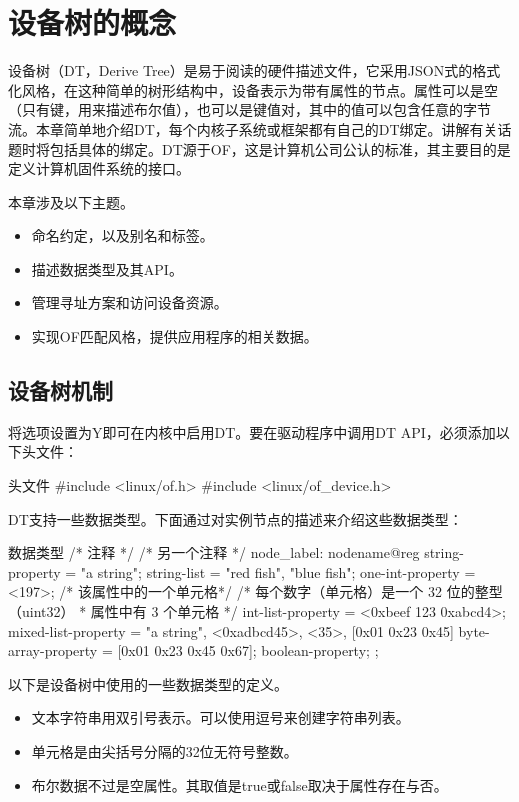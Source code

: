 \documentclass[lang=cn,newtx,10pt,scheme=chinese]{elegantbook}
\begin{document}
\chapter{设备树的概念}

设备树（DT，Derive Tree）是易于阅读的硬件描述文件，它采用JSON式的格式化风格，在这种简单的树形结构中，设备表示为带有属性的节点。属性可以是空（只有键，用来描述布尔值），也可以是键值对，其中的值可以包含任意的字节流。本章简单地介绍DT，每个内核子系统或框架都有自己的DT绑定。讲解有关话题时将包括具体的绑定。DT源于OF，这是计算机公司公认的标准，其主要目的是定义计算机固件系统的接口。

本章涉及以下主题。

\begin{itemize}
\item 命名约定，以及别名和标签。
\item 描述数据类型及其API。
\item 管理寻址方案和访问设备资源。
\item 实现OF匹配风格，提供应用程序的相关数据。
\end{itemize}

\section{设备树机制}

将选项设置为Y即可在内核中启用DT。要在驱动程序中调用DT API，必须添加以下头文件：

\begin{mycode}{头文件}
#include <linux/of.h>
#include <linux/of_device.h>
\end{mycode}

DT支持一些数据类型。下面通过对实例节点的描述来介绍这些数据类型：

\begin{mycode}{数据类型}
/* 注释 */
/* 另一个注释 */
node_label: nodename@reg{
    string-property = "a string";
    string-list = "red fish", "blue fish";
    one-int-property = <197>; /* 该属性中的一个单元格*/
    /* 每个数字（单元格）是一个 32 位的整型（uint32）
     * 属性中有 3 个单元格
     */
    int-list-property = <0xbeef 123 0xabcd4>;
    mixed-list-property = "a string", <0xadbcd45>, <35>, [0x01 0x23 0x45]
    byte-array-property = [0x01 0x23 0x45 0x67];
    boolean-property;
};
\end{mycode}

以下是设备树中使用的一些数据类型的定义。

\begin{itemize}
\item 文本字符串用双引号表示。可以使用逗号来创建字符串列表。
\item 单元格是由尖括号分隔的32位无符号整数。
\item 布尔数据不过是空属性。其取值是true或false取决于属性存在与否。
\end{itemize}
\end{document}
